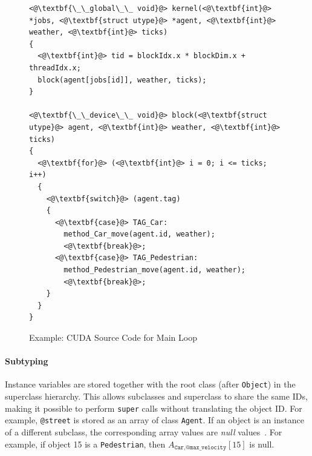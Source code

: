 \documentclass[preprint]{sigplanconf}
\begin{document}
\lstset{language=C++}
\begin{figure}[!htp]
\begin{lstlisting}
<@\textbf{\_\_global\_\_ void}@> kernel(<@\textbf{int}@> *jobs, <@\textbf{struct utype}@> *agent, <@\textbf{int}@> weather, <@\textbf{int}@> ticks)
{
  <@\textbf{int}@> tid = blockIdx.x * blockDim.x + threadIdx.x;
  block(agent[jobs[id]], weather, ticks);
}

<@\textbf{\_\_device\_\_ void}@> block(<@\textbf{struct utype}@> agent, <@\textbf{int}@> weather, <@\textbf{int}@> ticks)
{
  <@\textbf{for}@> (<@\textbf{int}@> i = 0; i <= ticks; i++)
  {
    <@\textbf{switch}@> (agent.tag)
    {
      <@\textbf{case}@> TAG_Car:
        method_Car_move(agent.id, weather);
        <@\textbf{break}@>;
      <@\textbf{case}@> TAG_Pedestrian:
        method_Pedestrian_move(agent.id, weather);
        <@\textbf{break}@>;
    }
  }
}
\end{lstlisting}
\caption{Example: CUDA Source Code for Main Loop}
\label{fig:listing_cuda_main}
\end{figure}

\paragraph{Subtyping}

Instance variables are stored together with the root class (after \texttt{Object}) in the superclass hierarchy. This allows subclasses and superclass to share the same IDs, making it possible to perform \texttt{super} calls without translating the object ID. For example, \texttt{@street} is stored as an array of class \texttt{Agent}. If an object is an instance of a different subclass, the corresponding array values are \emph{null} values~\cite{Mattis:2015:COI:2814228.2814230}. For example, if object 15 is a \texttt{Pedestrian}, then $A_{\texttt{Car}, \texttt{@max\_velocity}}[15]$ is null.
\end{document}
